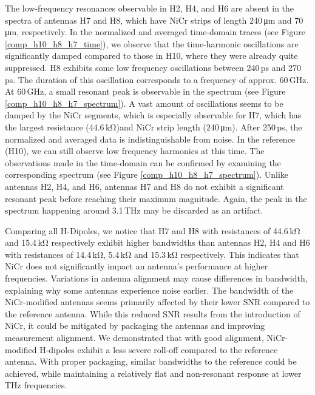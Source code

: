 The low-frequency resonances observable in H2, H4, and H6 are absent in the spectra of antennas H7 and H8, which have NiCr strips of length \num{240}\,\si{\micro \meter} and \num{70}\,\si{\micro \meter}, respectively. In the normalized and averaged time-domain traces (see Figure \ref{comp_h10_h8_h7_time}), we observe that the time-harmonic oscillations are significantly damped compared to those in H10, where they were already quite suppressed. H8 exhibits some low frequency oscillations between \num{240}\,\si{\pico \s} and \num{270}\,\si{\pico \s}. The duration of this oscillation corresponds to a frequency of approx. \num{60}\,\si{\giga \hertz}. At \num{60}\,\si{\giga \hertz}, a small resonant peak is observable in the spectrum (see Figure \ref{comp_h10_h8_h7_spectrum}). A vast amount of oscillations seems to be damped by the NiCr segments, which is especially observable for H7, which has the largest resistance (\num{44.6}\,\si{\kilo \ohm})and NiCr strip length (\num{240}\,\si{\micro \meter}). After \num{250}\,\si{\pico \s}, the normalized and averaged data is indistinguishable from noise. In the reference (H10), we can still observe low frequency harmonics at this time. The observations made in the time-domain can be confirmed by examining the corresponding spectrum (see Figure \ref{comp_h10_h8_h7_spectrum}). Unlike antennas H2, H4, and H6, antennas H7 and H8 do not exhibit a significant resonant peak before reaching their maximum magnitude. Again, the peak in the spectrum happening around \num{3.1}\,\si{\tera \hertz} may be discarded as an artifact.

Comparing all H-Dipoles, we notice that H7 and H8 with resistances of \num{44.6}\,\si{\kilo \ohm} and \num{15.4}\,\si{\kilo \ohm} respectively exhibit higher bandwidths than antennas H2, H4 and H6 with resistances of \num{14.4}\,\si{\kilo \ohm}, \num{5.4}\,\si{\kilo \ohm} and \num{15.3}\,\si{\kilo \ohm} respectively. This indicates that NiCr does not significantly impact an antenna’s performance at higher frequencies. Variations in antenna alignment may cause differences in bandwidth, explaining why some antennas experience noise earlier. The bandwidth of the NiCr-modified antennas seems primarily affected by their lower SNR compared to the reference antenna. While this reduced SNR results from the introduction of NiCr, it could be mitigated by packaging the antennas and improving measurement alignment. We demonstrated that with good alignment, NiCr-modified H-dipoles exhibit a less severe roll-off compared to the reference antenna. With proper packaging, similar bandwidths to the reference could be achieved, while maintaining a relatively flat and non-resonant response at lower THz frequencies.

